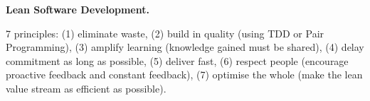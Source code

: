 \textbf{Lean Software Development.}

7 principles: (1) eliminate waste, (2) build in quality (using TDD or Pair Programming), (3) amplify learning (knowledge gained must be shared), (4) delay commitment as long as possible, (5) deliver fast, (6) respect people (encourage proactive feedback and constant feedback), (7) optimise the whole (make the lean value stream as efficient as possible).
